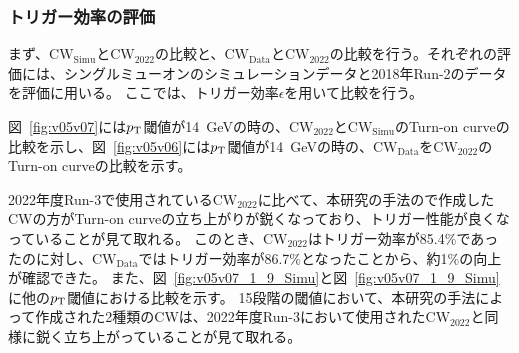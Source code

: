 \subsubsection{トリガー効率の評価}
まず、$\mathrm{CW_{Simu}}$と$\mathrm{CW_{2022}}$の比較と、$\mathrm{CW_{Data}}$と$\mathrm{CW_{2022}}$の比較を行う。それぞれの評価には、シングルミューオンのシミュレーションデータと2018年Run-2のデータを評価に用いる。
ここでは、トリガー効率$\epsilon$を用いて比較を行う。

図~\ref{fig:v05v07}には$p_{\rm{T}}$閾値が14~GeVの時の、$\mathrm{CW_{2022}}$と$\mathrm{CW_{Simu}}$のTurn-on curveの比較を示し、図~\ref{fig:v05v06}には$p_{\rm{T}}$閾値が14~GeVの時の、$\mathrm{CW_{Data}}$を$\mathrm{CW_{2022}}$のTurn-on curveの比較を示す。

2022年度Run-3で使用されている$\mathrm{CW_{2022}}$に比べて、本研究の手法ので作成したCWの方がTurn-on curveの立ち上がりが鋭くなっており、トリガー性能が良くなっていることが見て取れる。
このとき、$\mathrm{CW_{2022}}$はトリガー効率が85.4$\%$であったのに対し、$\mathrm{CW_{Data}}$ではトリガー効率が86.7$\%$となったことから、約1$\%$の向上が確認できた。
また、図~\ref{fig:v05v07_1_9_Simu}と図~\ref{fig:v05v07_1_9_Simu}に他の$p_{\rm{T}}$閾値における比較を示す。
15段階の閾値において、本研究の手法によって作成された2種類のCWは、2022年度Run-3において使用された$\mathrm{CW_{2022}}$と同様に鋭く立ち上がっていることが見て取れる。

